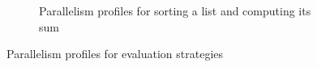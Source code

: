 \begin{figure}[H]
{\begin{minipage}[c]{1.2\textwidth}
\begin{subfigure}{.45\textwidth}
  \caption{Parallelism profiles for sorting a list and computing its sum}
  \label{fig:eval-para-2}%
\end{subfigure}%
\end{minipage}}
\caption{Parallelism profiles for evaluation strategies\cite{DBLP:journals/cl/Tremblay-parallel}}%
\label{fig:eval-para}%
\end{figure}%
